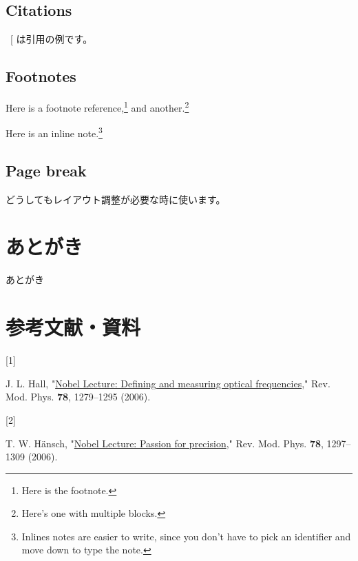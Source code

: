 \documentclass[
  japanese,
  letterpaper,
  lualatex,
  ja=standard,
  10pt,
  a4paper,
  textwidth-limit=50,
  openany]{bxjsbook}
\newlength{\cslhangindent}
\newlength{\csllabelwidth}
\newenvironment{CSLReferences}[2] %
 {\begin{list}{}{%
  \setlength{\itemindent}{0pt}
  \setlength{\leftmargin}{0pt}
  \setlength{\parsep}{0pt}
  \ifodd #1
   \setlength{\leftmargin}{\cslhangindent}
   \setlength{\itemindent}{-1\cslhangindent}
  \fi
  \setlength{\itemsep}{#2\baselineskip}}}
 {\end{list}}
\newcommand{\CSLLeftMargin}[1]{\parbox[t]{\csllabelwidth}{\strut#1\strut}}
\newcommand{\CSLRightInline}[1]{\parbox[t]{\linewidth - \csllabelwidth}{\strut#1\strut}}
\begin{document}
\section{Citations}\label{citations-1}

~{[}\citeproc{ref-Hansch2006}{2}{]} は引用の例です。

\section{Footnotes}\label{footnotes-1}

Here is a footnote reference,\footnote{Here is the footnote.} and
another.\footnote{Here's one with multiple blocks.}

Here is an inline note.\footnote{Inlines notes are easier to write,
  since you don't have to pick an identifier and move down to type the
  note.}

\section{Page break}\label{page-break-1}

どうしてもレイアウト調整が必要な時に使います。


\chapter*{あとがき}\label{ux3042ux3068ux304cux304d}


あとがき


\chapter*{参考文献・資料}\label{ux53c2ux8003ux6587ux732eux8cc7ux6599}


\label{refs}
\begin{CSLReferences}{0}{0}
\CSLLeftMargin{{[}1{]} }%
\CSLRightInline{J. L. Hall,
"\href{https://doi.org/10.1103/RevModPhys.78.1279}{Nobel Lecture:
Defining and measuring optical frequencies}," Rev. Mod. Phys.
\textbf{78}, 1279--1295 (2006).}

\CSLLeftMargin{{[}2{]} }%
\CSLRightInline{T. W. Hänsch,
"\href{https://doi.org/10.1103/RevModPhys.78.1297}{Nobel Lecture:
Passion for precision}," Rev. Mod. Phys. \textbf{78}, 1297--1309
(2006).}

\end{CSLReferences}
\end{document}
